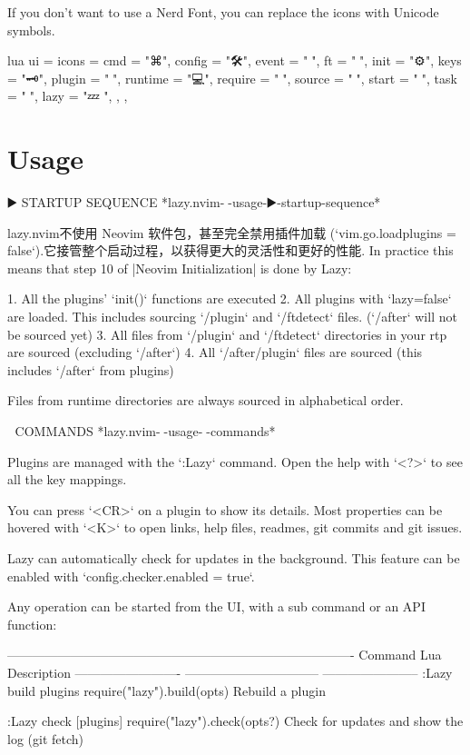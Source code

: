 \begin{listing}
If you don’t want to use a Nerd Font, you can replace the icons with Unicode symbols. ~

lua
{
ui = {
icons = {
cmd = "⌘",
config = "🛠",
event = "📅",
ft = "📂",
init = "⚙",
keys = "🗝",
plugin = "🔌",
runtime = "💻",
require = "🌙",
source = "📄",
start = "🚀",
task = "📌",
lazy = "💤 ",
},
},
}


\section{Usage}

▶️ STARTUP SEQUENCE         *lazy.nvim-🚀-usage-▶️-startup-sequence*


lazy.nvim不使用 Neovim 软件包，甚至完全禁用插件加载 (`vim.go.loadplugins = false`).它接管整个启动过程，以获得更大的灵活性和更好的性能.
In practice this means that step 10 of |Neovim Initialization| is done by Lazy:

1. All the plugins’ `init()` functions are executed
2. All plugins with `lazy=false` are loaded. This includes sourcing `/plugin` and `/ftdetect` files. (`/after` will not be sourced yet)
3. All files from `/plugin` and `/ftdetect` directories in your rtp are sourced (excluding `/after`)
4. All `/after/plugin` files are sourced (this includes `/after` from plugins)

Files from runtime directories are always sourced in alphabetical order.


🚀 COMMANDS                             *lazy.nvim-🚀-usage-🚀-commands*

Plugins are managed with the `:Lazy` command. Open the help with `<?>` to see
all the key mappings.

You can press `<CR>` on a plugin to show its details. Most properties can be
hovered with `<K>` to open links, help files, readmes, git commits and git
issues.

Lazy can automatically check for updates in the background. This feature can be
enabled with `config.checker.enabled = true`.

Any operation can be started from the UI, with a sub command or an API
function:

  ----------------------------------------------------------------------------------
  Command                   Lua                              Description
  ------------------------- -------------------------------- -----------------------
  :Lazy build {plugins}     require("lazy").build(opts)      Rebuild a plugin

  :Lazy check [plugins]     require("lazy").check(opts?)     Check for updates and
                                                             show the log (git
                                                             fetch)


\end{listing}
